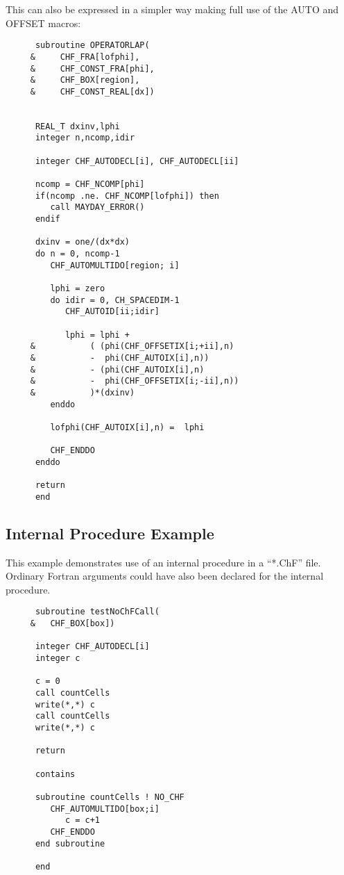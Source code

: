 This can also be expressed in a simpler way making full use of the
AUTO and OFFSET macros:
\begin{small}
\begin{verbatim}
      subroutine OPERATORLAP(
     &     CHF_FRA[lofphi],
     &     CHF_CONST_FRA[phi],
     &     CHF_BOX[region],
     &     CHF_CONST_REAL[dx])


      REAL_T dxinv,lphi
      integer n,ncomp,idir
      
      integer CHF_AUTODECL[i], CHF_AUTODECL[ii]

      ncomp = CHF_NCOMP[phi]
      if(ncomp .ne. CHF_NCOMP[lofphi]) then
         call MAYDAY_ERROR()
      endif

      dxinv = one/(dx*dx)
      do n = 0, ncomp-1
         CHF_AUTOMULTIDO[region; i]

         lphi = zero
         do idir = 0, CH_SPACEDIM-1
            CHF_AUTOID[ii;idir]

            lphi = lphi +
     &           ( (phi(CHF_OFFSETIX[i;+ii],n)
     &           -  phi(CHF_AUTOIX[i],n))
     &           - (phi(CHF_AUTOIX[i],n)
     &           -  phi(CHF_OFFSETIX[i;-ii],n))
     &           )*(dxinv)
         enddo

         lofphi(CHF_AUTOIX[i],n) =  lphi

         CHF_ENDDO
      enddo

      return
      end
\end{verbatim}
\end{small}

\subsection{Internal Procedure Example}
\label{subsec:InternalProcExample}
This example demonstrates use of an internal procedure in a ``*.ChF'' file.  Ordinary Fortran arguments could have also been declared for the internal procedure.
\begin{small}
\begin{verbatim}
      subroutine testNoChFCall(
     &   CHF_BOX[box])

      integer CHF_AUTODECL[i]
      integer c

      c = 0
      call countCells
      write(*,*) c
      call countCells
      write(*,*) c

      return

      contains

      subroutine countCells ! NO_CHF
         CHF_AUTOMULTIDO[box;i]
            c = c+1
         CHF_ENDDO
      end subroutine

      end
\end{verbatim}
\end{small}

